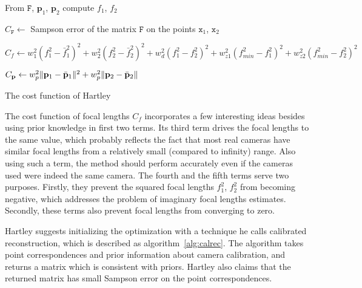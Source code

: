 \begin{algorithm}
\SetAlgoLined 
\LinesNotNumbered
 \Begin
    {From $\mathtt{F}$, $\mathbf{p}_1$, $\mathbf{p}_2$ compute $f_1$, $f_2$\;
    
    $C_\mathtt{F} \leftarrow$ Sampson error of the matrix $\mathtt{F}$ on the points $\mathtt{x}_1$, $\mathtt{x}_2$\;
    
    
    $C_f \leftarrow w_1^2(f_1^2-\bar{f}_1^2)^2 + w_2^2(f_2^2-\bar{f}_2^2)^2  + w_d^2(f_1^2-f_2^2)^2 + w_{z1}^2(f_{min}^2 - f_1^2)^2 + w_{z2}^2(f_{min}^2-f_2^2)^2 $\;
    
    $C_\mathbf{p} \leftarrow w_p^2 \lVert\mathbf{p}_1-\bar{\mathbf{p}}_1\rVert^2 + w_p^2 \lVert\mathbf{p}_2-\bar{\mathbf{p}}_2\rVert$\;
    
    }
 \caption{The cost function of Hartley~\cite{HartleyPriors}}
 \label{alg:hart_cost}
\end{algorithm}


The cost function of focal lengths $C_f$ incorporates a few interesting ideas besides using prior knowledge in first two terms. Its third term drives the focal lengths to the same value, which probably reflects the fact that most real cameras have similar focal lengths from a relatively small (compared to infinity) range. Also using such a term, the method should perform accurately even if the cameras used were indeed the same camera. The fourth and the fifth terms serve two purposes. Firstly, they prevent the squared focal lengths $f_1^2$, $f_2^2$ from becoming negative, which addresses the problem of imaginary focal lengths estimates. Secondly, these terms also prevent focal lengths from converging to zero. %

Hartley suggests initializing the optimization with a technique he calls calibrated reconstruction, which is described as algorithm~\ref{alg:calrec}. The algorithm takes point correspondences and prior information about camera calibration, and returns a matrix which is consistent with priors. Hartley also claims that the returned matrix has small Sampson error on the point correspondences.

